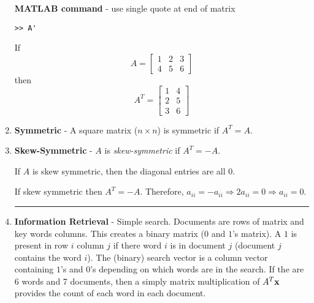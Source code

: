 \begin{enumerate}
\textbf{MATLAB command} - use single quote at end of matrix
\begin{verbatim}
>> A'
\end{verbatim}

\begin{example}
If  \[ A = \begin{bmatrix} 1 & 2 &3 \\ 4 & 5 & 6 \end{bmatrix} \]
then
\[ A^T = \begin{bmatrix} 1 & 4  \\ 2 & 5 \\ 3 & 6 \end{bmatrix} \]
 \end{example}
 
 
 \item \textbf{Symmetric} - A square matrix ($n \times n$) is symmetric if $A^T = A$.
 
 
 
  \item \textbf{Skew-Symmetric} - $A$ is \textit{skew-symmetric} if $A^T = -A$.  
  
  \begin{theorem}
  	If $A$ is skew symmetric, then the diagonal entries are all $0$.  
	
	\proof If skew symmetric then $A^T = -A$.  Therefore, $a_{ii} = -a_{ii} \Rightarrow 2 a_{ii} = 0 \Rightarrow a_{ii} = 0$.  
  \end{theorem}





\rule[0.01in]{\textwidth}{0.0025in}

























\item \textbf{Information Retrieval} - Simple search.  Documents are rows of matrix and key words columns.  This creates a binary matrix ($0$ and $1$'s matrix).  A $1$ is present in row $i$ column $j$ if there word $i$ is in document $j$ (document $j$ contains the word $i$).  The (binary) search vector is a column vector containing $1$'s and $0$'s depending on which words are in the search.  If the are 6 words and 7 documents, then a simply matrix multiplication of $A^T {\bf x}$ provides the count of each word in each document.


\end{enumerate}
